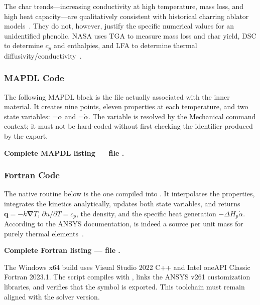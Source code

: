 \documentclass[oneside,openany]{amsdtx}
\newcommand{\pd}{\partial}
\newcommand{\vect}[1]{\bm{#1}}
\begin{document}
The char trends---increasing conductivity at high temperature, mass loss, and
high heat capacity---are qualitatively consistent with historical charring
ablator models~\cite{clark1972,ewing2013}. They do not, however, justify the
specific numerical values for an unidentified phenolic. NASA uses TGA to
measure mass loss and char yield, DSC to determine \(c_p\) and enthalpies, and
LFA to determine thermal diffusivity/conductivity~\cite{nasa-testing}.

\subsubsection{MAPDL Code}
\label{sec:apdl-code}

The following MAPDL block is the file actually associated with the inner
material. It creates nine  points, eleven properties at each
temperature, and two state variables: =\(\alpha\) and
=\(\dot\alpha\). The  variable is resolved by the
Mechanical command context; it must not be hard-coded without first checking
the identifier produced by the export.

\medskip
\noindent\textbf{Complete MAPDL listing --- file
.}


\subsubsection{Fortran  Code}

The native routine below is the one compiled into
. It interpolates the  properties,
integrates the kinetics analytically, updates both state variables, and returns
\(\vect q=-k\vect\nabla T\), \(\pd u/\pd T=c_p\), the density, and the
specific heat generation \(-\Delta H_p\dot\alpha\). According to the ANSYS
documentation,  is indeed a source per unit mass for purely thermal
elements~\cite{ansys-usermatth}.

\medskip
\noindent\textbf{Complete Fortran listing --- file .}


The Windows x64 build uses Visual Studio 2022 C++ and Intel oneAPI Classic
Fortran 2023.1. The  script compiles with
, links the ANSYS v261 customization libraries, and verifies
that the  symbol is exported. This toolchain must remain aligned
with the solver version.
\end{document}
